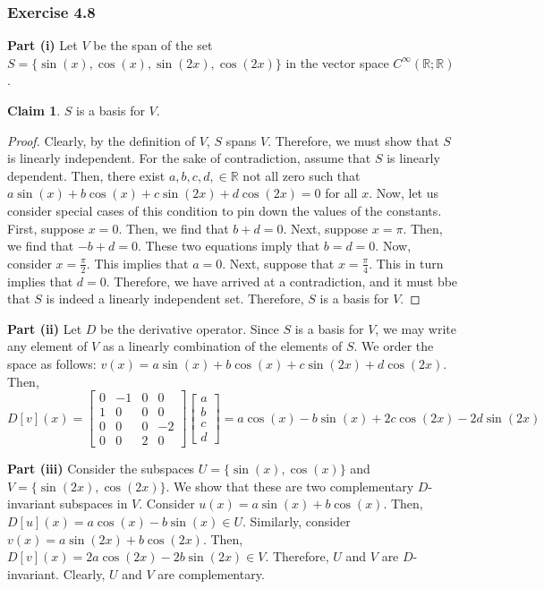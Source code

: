 \documentclass[letterpaper,12pt]{article}
\theoremstyle{definition}
\newtheorem{claim}[theorem]{Claim}
\begin{document}
\subsubsection*{Exercise 4.8}
\noindent\textbf{Part (i)} Let $V$ be the span of the set $S = \{\sin(x), \cos(x), \sin(2x), \cos(2x)\}$ in the vector space $C^{\infty}(\mathbb{R}; \mathbb{R})$. 
\begin{claim}
	$S$ is a basis for $V$.
\end{claim}
\begin{proof}
	Clearly, by the definition of $V$, $S$ spans $V$. Therefore, we must show that $S$ is linearly independent. For the sake of contradiction, assume that $S$ is linearly dependent. Then, there exist $a, b, c, d, \in \mathbb{R}$ not all zero such that $a \sin(x) + b \cos(x) + c\sin(2x) + d\cos(2x) = 0$ for all  $x$. Now, let us consider special cases of this condition to pin down the values of the constants. First, suppose $x = 0$. Then, we find that $b + d = 0$. Next, suppose $x = \pi$. Then, we find that $-b + d = 0$.  These two equations imply that $b = d = 0$. Now, consider $x = \frac{\pi}{2}$. This implies that $a = 0$. Next, suppose that $ x = \frac{\pi}{4}$. This in turn implies that $d= 0$. Therefore, we have arrived at a contradiction, and it must bbe that $S$ is indeed a linearly independent set. Therefore, $S$ is a basis for $V$. 
\end{proof}

\noindent\textbf{Part (ii)}
Let $D$ be the derivative operator. Since $S$ is a basis for $V$, we may write any element of $V$ as a linearly combination of the elements of $S$. We order the space as follows: $v(x) = a \sin(x) + b \cos(x) + c\sin(2x) + d\cos(2x)$. Then, 
\begin{equation}
	D[v](x) = 
	\begin{bmatrix}
	0 & -1 & 0 & 0 \\
	1 & 0 & 0 & 0 \\
	0 & 0 & 0 & -2 \\
	0 & 0 & 2 & 0 
	\end{bmatrix}
	\begin{bmatrix}
	a \\ b \\ c \\ d
	\end{bmatrix}
	= a \cos(x) - b\sin(x) + 2c \cos(2x) - 2d\sin(2x)
\end{equation}

\noindent\textbf{Part (iii)}
Consider the subspaces $U = \{\sin(x), \cos(x)\}$ and $V = \{\sin(2x), \cos(2x)\}$. We show that these are two complementary $D$-invariant subspaces in $V$. Consider $u(x) = a \sin(x) + b\cos(x)$. Then, $D[u](x) = a \cos(x) - b \sin(x) \in U$. Similarly, consider $v(x) = a \sin(2x) + b \cos(2x)$. Then, $D[v](x) = 2 a \cos(2x) - 2b \sin(2x) \in V$. Therefore, $U$ and $V$ are $D$-invariant. Clearly, $U$ and $V$ are complementary. 
\end{document}
